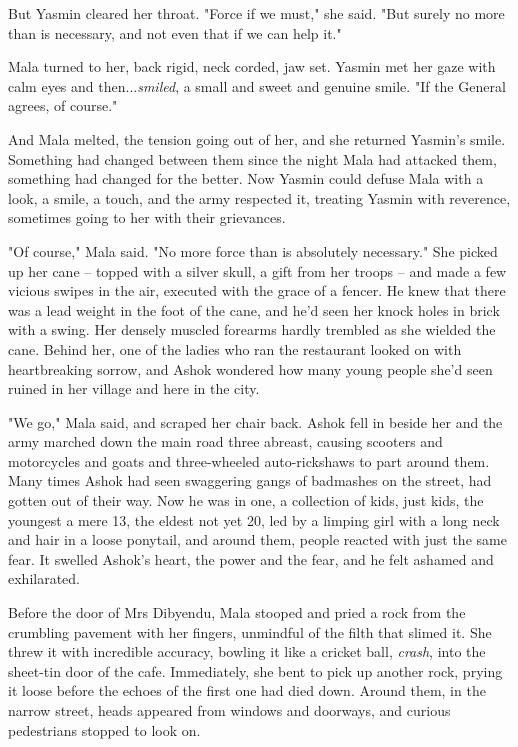 But Yasmin cleared her throat. "Force if we must," she said. "But
surely no more than is necessary, and not even that if we can help
it."

Mala turned to her, back rigid, neck corded, jaw set. Yasmin met
her gaze with calm eyes and then...\emph{smiled}, a small and sweet
and genuine smile. "If the General agrees, of course."

And Mala melted, the tension going out of her, and she returned
Yasmin's smile. Something had changed between them since the night
Mala had attacked them, something had changed for the better. Now
Yasmin could defuse Mala with a look, a smile, a touch, and the
army respected it, treating Yasmin with reverence, sometimes going
to her with their grievances.

"Of course," Mala said. "No more force than is absolutely
necessary." She picked up her cane -- topped with a silver skull, a
gift from her troops -- and made a few vicious swipes in the air,
executed with the grace of a fencer. He knew that there was a lead
weight in the foot of the cane, and he'd seen her knock holes in
brick with a swing. Her densely muscled forearms hardly trembled as
she wielded the cane. Behind her, one of the ladies who ran the
restaurant looked on with heartbreaking sorrow, and Ashok wondered
how many young people she'd seen ruined in her village and here in
the city.

"We go," Mala said, and scraped her chair back. Ashok fell in
beside her and the army marched down the main road three abreast,
causing scooters and motorcycles and goats and three-wheeled
auto-rickshaws to part around them. Many times Ashok had seen
swaggering gangs of badmashes on the street, had gotten out of
their way. Now he was in one, a collection of kids, just kids, the
youngest a mere 13, the eldest not yet 20, led by a limping girl
with a long neck and hair in a loose ponytail, and around them,
people reacted with just the same fear. It swelled Ashok's heart,
the power and the fear, and he felt ashamed and exhilarated.

Before the door of Mrs Dibyendu, Mala stooped and pried a rock from
the crumbling pavement with her fingers, unmindful of the filth
that slimed it. She threw it with incredible accuracy, bowling it
like a cricket ball, \emph{crash}, into the sheet-tin door of the
cafe. Immediately, she bent to pick up another rock, prying it
loose before the echoes of the first one had died down. Around
them, in the narrow street, heads appeared from windows and
doorways, and curious pedestrians stopped to look on.

